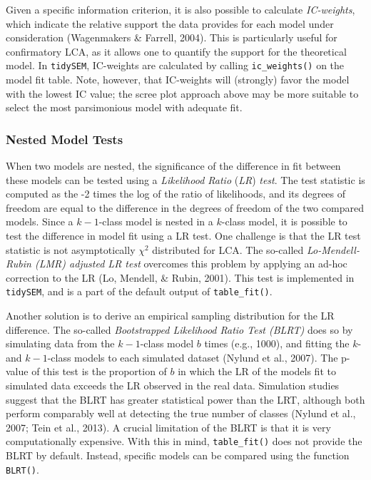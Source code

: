 \documentclass[
  ,man,floatsintext]{apa6}
\begin{document}
Given a specific information criterion, it is also possible to calculate \emph{IC-weights},
which indicate the relative support the data provides for each model under consideration (Wagenmakers \& Farrell, 2004).
This is particularly useful for confirmatory LCA,
as it allows one to quantify the support for the theoretical model.
In \texttt{tidySEM}, IC-weights are calculated by calling \texttt{ic\_weights()} on the model fit table.
Note, however, that IC-weights will (strongly) favor the model with the lowest IC value;
the scree plot approach above may be more suitable to select the most parsimonious model with adequate fit.

\hypertarget{nested-model-tests}{%
\subsubsection{Nested Model Tests}\label{nested-model-tests}}

When two models are nested, the significance of the difference in fit between these models can be tested using a \emph{Likelihood Ratio} (\emph{LR}) \emph{test}.
The test statistic is computed as the -2 times the log of the ratio of likelihoods,
and its degrees of freedom are equal to the difference in the degrees of freedom of the two compared models.
Since a \(k-1\)-class model is nested in a \(k\)-class model,
it is possible to test the difference in model fit using a LR test.
One challenge is that the LR test statistic is not asymptotically \(\chi^2\) distributed for LCA.
The so-called \emph{Lo-Mendell-Rubin (LMR) adjusted LR test} overcomes this problem by applying an ad-hoc correction to the LR (Lo, Mendell, \& Rubin, 2001).
This test is implemented in \texttt{tidySEM}, and is a part of the default output of \texttt{table\_fit()}.

Another solution is to derive an empirical sampling distribution for the LR difference.
The so-called \emph{Bootstrapped Likelihood Ratio Test (BLRT)} does so by simulating data from the \(k-1\)-class model \(b\) times (e.g., 1000),
and fitting the \(k\)- and \(k-1\)-class models to each simulated dataset (Nylund et al., 2007).
The p-value of this test is the proportion of \(b\) in which the LR of the models fit to simulated data exceeds the LR observed in the real data.
Simulation studies suggest that the BLRT has greater statistical power than the LRT,
although both perform comparably well at detecting the true number of classes (Nylund et al., 2007; Tein et al., 2013).
A crucial limitation of the BLRT is that it is very computationally expensive.
With this in mind, \texttt{table\_fit()} does not provide the BLRT by default.
Instead, specific models can be compared using the function \texttt{BLRT()}.
\end{document}
